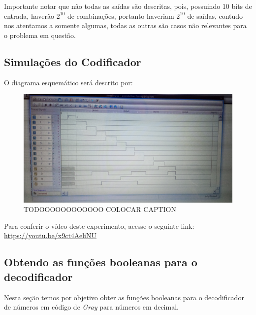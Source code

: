 \documentclass[12pt]{article}
\begin{document}
Importante notar que não todas as saídas são descritas, pois, possuindo 10 bits
de entrada, haverão $2^{10}$ de combinações, portanto haveriam $2^{10}$ de
saídas, contudo nos atentamos a somente algumas, todas as outras são casos não
relevantes para o problema em questão.

\subsection{Simulações do Codificador}\label{sec:2.2}

O diagrama esquemático será descrito por:

\begin{figure}[H]
    \centering
    \includegraphics[width=12cm]{Exp05/2.2.png}
    \caption{TODOOOOOOOOOOOO COLOCAR CAPTION}
    \label{fig:2.2.png}
\end{figure}

Para conferir o vídeo deste experimento, acesse o seguinte link:
\href{https://youtu.be/x9ct4AeliNU}{https://youtu.be/x9ct4AeliNU}

\subsection{Obtendo as funções booleanas para o decodificador}\label{sec:2.3}

Nesta seção temos por objetivo obter as funções booleanas para o decodificador
de números em código de \emph{Gray} para números em decimal.
\end{document}

